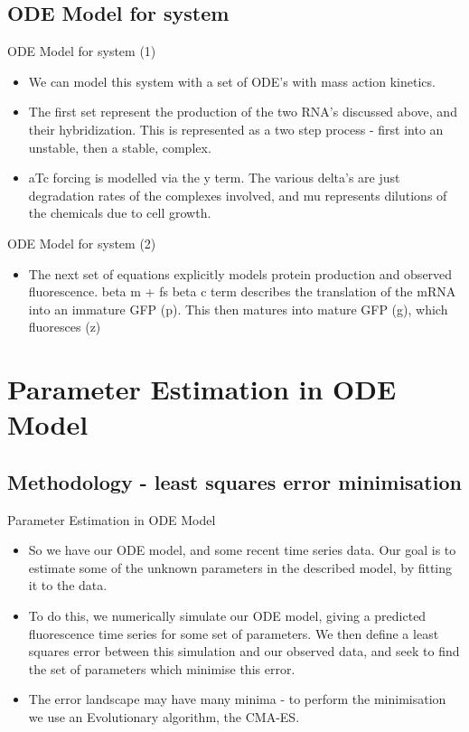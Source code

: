 \documentclass[8pt]{beamer}
\begin{document}
\subsection{ODE Model for system}
\begin{frame}{ODE Model for system (1)}{}
\begin{itemize}
\item We can model this system with a set of ODE's with mass action kinetics.
\item The first set represent the production of the two RNA's discussed above, and their hybridization. This is represented as a two step process - first into an unstable, then a stable, complex.
\item aTc forcing is modelled via the y term. The various delta's are just degradation rates of the complexes involved, and mu represents dilutions of the chemicals due to cell growth.
\end{itemize} 
\end{frame}

\begin{frame}{ODE Model for system (2)}{}
\begin{itemize}
\item The next set of equations explicitly models protein production and observed fluorescence. beta m + fs beta c term describes the translation of the mRNA into an immature GFP (p). This then matures into mature GFP (g), which fluoresces (z)  
\end{itemize}
\end{frame}

\section{Parameter Estimation in ODE Model}


\subsection{Methodology - least squares error minimisation}

\begin{frame}{Parameter Estimation in ODE Model}
  \begin{itemize}
\item So we have our ODE model, and some recent time series data. Our goal is to estimate some of the unknown parameters in the described model, by fitting it to the data.
\item To do this, we  numerically simulate our ODE model, giving a predicted fluorescence time series for some set of parameters. We then define a least squares error between this simulation and our observed data, and seek to find the set of parameters which minimise this error.
\item The error landscape may have many minima - to perform the minimisation we use an Evolutionary algorithm, the CMA-ES.
\end{itemize}
\end{frame}
\end{document}
